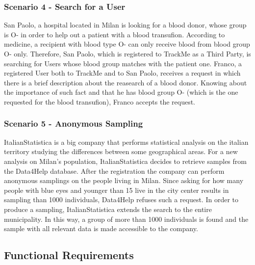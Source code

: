\documentclass[12pt,a4paper]{article}
\begin{document}
	\subsubsection*{Scenario 4 - Search for a User}
		San Paolo, a hospital located in Milan is looking for a blood donor, whose  group is O- in order to help out a patient with a blood transufion. According to medicine, a recipient with blood type O- can only receive blood from blood group O- only. Therefore, San Paolo, which is registered to TrackMe as a Third Party, is searching for Users whose blood group matches with the patient one.
		Franco, a registered User both to TrackMe and to San Paolo, receives a request in which there is a brief description about the reasearch of a blood donor. Knowing about the importance of such fact and that he has blood group O- (which is the one requested for the blood transufion), Franco accepts the request.
		
	\subsubsection*{Scenario 5 - Anonymous Sampling}
		ItalianStatistica is a big company that performs statistical analysis on the italian territory studying the differences between some geographical areas. For a new analysis on Milan's population, ItalianStatistica decides to retrieve samples from the Data4Help database. After the registration the company can perform anonymous samplings on the people living in Milan. Since asking for how many people with blue eyes and younger than 15 live in the city center results in sampling than 1000 individuals, Data4Help refuses such a request. In order to produce a sampling, ItalianStatistica extends the search to the entire municipality. In this way, a group of more than 1000 individuals is found and the sample with all relevant data is made accessible to the company.
	
	\newpage
	
	\subsection{Functional Requirements}
	
\end{document}
